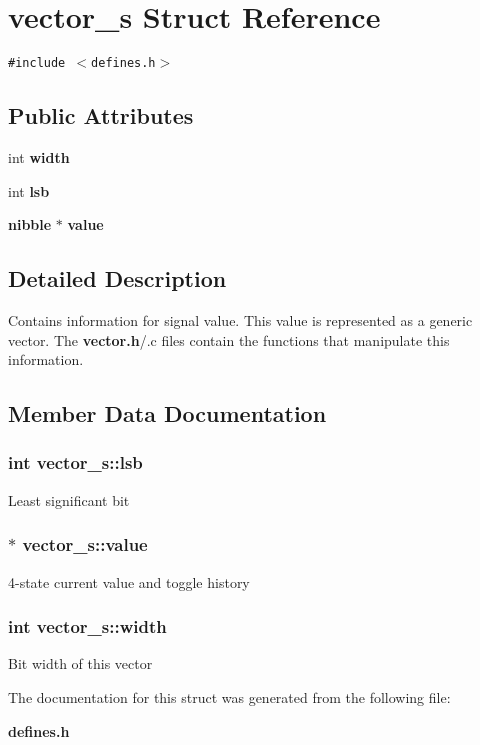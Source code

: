 \section{vector\_\-s  Struct Reference}
\label{structvector__s}
{\tt \#include $<$defines.h$>$}

\subsection*{Public Attributes}
\begin{CompactItemize}
\item 
int {\bf width}
\item 
int {\bf lsb}
\item 
{\bf nibble} $\ast$ {\bf value}
\end{CompactItemize}


\subsection{Detailed Description}
Contains information for signal value. This value is represented as a generic vector. The {\bf vector.h}/.c files contain the functions that manipulate this information. 



\subsection{Member Data Documentation}
\subsubsection{\setlength{\rightskip}{0pt plus 5cm}int vector\_\-s::lsb}\label{structvector__s_m1}


Least significant bit 
\subsubsection{$\ast$ vector\_\-s::value}\label{structvector__s_m2}


4-state current value and toggle history 
\subsubsection{\setlength{\rightskip}{0pt plus 5cm}int vector\_\-s::width}\label{structvector__s_m0}


Bit width of this vector 

The documentation for this struct was generated from the following file:\begin{CompactItemize}
\item 
{\bf defines.h}\end{CompactItemize}
